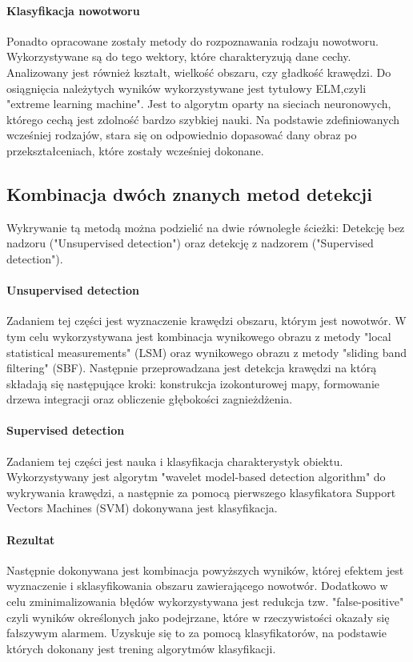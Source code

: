 \documentclass{sprawozdanie-agh}
\begin{document}
\paragraph{Klasyfikacja nowotworu\\}
Ponadto opracowane zostały metody do rozpoznawania rodzaju nowotworu. Wykorzystywane są do tego wektory, które charakteryzują dane cechy. Analizowany jest również kształt, wielkość obszaru, czy gładkość krawędzi. Do osiągnięcia należytych wyników wykorzystywane jest tytułowy ELM,czyli "extreme learning machine". Jest to algorytm oparty na sieciach neuronowych, którego cechą jest zdolność bardzo szybkiej nauki. Na podstawie zdefiniowanych wcześniej rodzajów, stara się on odpowiednio dopasować dany obraz po przekształceniach, które zostały wcześniej dokonane.

\subsection{Kombinacja dwóch znanych metod detekcji}
Wykrywanie tą metodą można podzielić na dwie równoległe ścieżki: Detekcję bez nadzoru ("Unsupervised detection") oraz detekcję z nadzorem ("Supervised detection").

\paragraph{Unsupervised detection\\}
Zadaniem tej części jest wyznaczenie krawędzi obszaru, którym jest nowotwór. W tym celu wykorzystywana jest kombinacja wynikowego obrazu z metody "local statistical measurements" (LSM) oraz wynikowego obrazu z metody "sliding band filtering" (SBF). Następnie przeprowadzana jest detekcja krawędzi na którą składają się następujące kroki: konstrukcja izokonturowej mapy, formowanie drzewa integracji oraz obliczenie głębokości zagnieżdżenia. 

\paragraph{Supervised detection\\}
Zadaniem tej części jest nauka i klasyfikacja charakterystyk obiektu. Wykorzystywany jest algorytm "wavelet model-based detection algorithm" do wykrywania krawędzi, a następnie za pomocą pierwszego klasyfikatora Support Vectors Machines (SVM) dokonywana jest klasyfikacja.

\paragraph{Rezultat\\}
Następnie dokonywana jest kombinacja powyższych wyników, której efektem jest wyznaczenie i sklasyfikowania obszaru zawierającego nowotwór.
Dodatkowo w celu zminimalizowania błędów wykorzystywana jest redukcja tzw. "false-positive" czyli wyników określonych jako podejrzane, które w rzeczywistości okazały się fałszywym alarmem. Uzyskuje się to za pomocą klasyfikatorów, na podstawie których dokonany jest trening algorytmów klasyfikacji.
\end{document}
